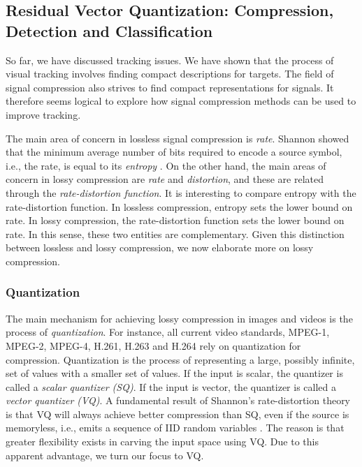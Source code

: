 \documentclass[12pt,letterpaper,doublespaced,ETD,proposal]{gt-ece-thesis}
\begin{document}
\begin{Body}
\subsection{Residual Vector Quantization: Compression, Detection and Classification}
So far, we have discussed tracking issues.  We have shown that the process of visual tracking involves finding compact descriptions for targets.  The field of signal compression also strives to find compact representations for signals.  It therefore seems logical to explore how signal compression methods can be used to improve tracking.  
 
The main area of concern in lossless signal compression is \emph{rate}.  Shannon showed that the minimum average number of bits required to encode a source symbol, i.e., the rate, is equal to its \emph{entropy} \cite{2005_BOOK_DataCompression_Sayood}.  On the other hand, the main areas of concern in lossy compression are \emph{rate} and \emph{distortion}, and these are related through the \emph{rate-distortion function}.  It is interesting to compare entropy with the rate-distortion function.  In lossless compression, entropy sets the lower bound on rate.  In lossy compression, the rate-distortion function sets the lower bound on rate.  In this sense, these two entities are complementary.  Given this distinction between lossless and lossy compression, we now elaborate more on lossy compression.

\subsubsection{Quantization}
The main mechanism for achieving lossy compression in images and videos is the process of \emph{quantization}.  For instance, all current video standards, MPEG-1, MPEG-2, MPEG-4, H.261, H.263 and H.264 rely on quantization for compression.  Quantization is the process of representing a large, possibly infinite, set of values with a smaller set of values.  If the input is scalar, the quantizer is called a \emph{scalar quantizer (SQ)}.  If the input is vector, the quantizer is called a \emph{vector quantizer (VQ)}.  A fundamental result of Shannon's rate-distortion theory is that VQ will always achieve better compression than SQ, even if the source is memoryless, i.e., emits a sequence of IID random variables \cite{1984_JNL_VQ_Gray}.   The reason is that greater flexibility exists in carving the input space using VQ.  Due to this apparent advantage, we turn our focus to VQ.


\end{Body}
\end{document}
